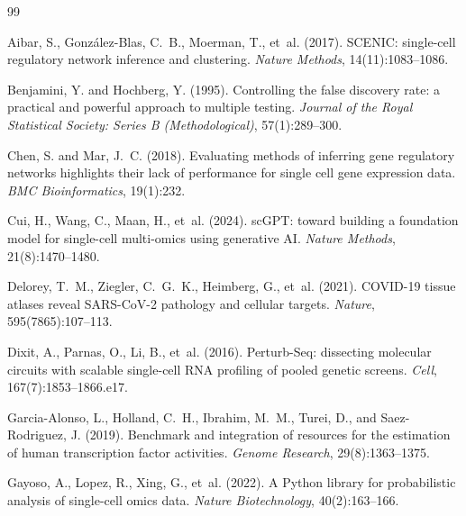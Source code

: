 \documentclass[12pt]{article}
\begin{document}
\begin{thebibliography}{99}

Aibar, S., Gonz{\'a}lez-Blas, C.~B., Moerman, T., et~al. (2017).
\newblock SCENIC: single-cell regulatory network inference and clustering.
\newblock \textit{Nature Methods}, 14(11):1083--1086.

Benjamini, Y. and Hochberg, Y. (1995).
\newblock Controlling the false discovery rate: a practical and powerful
  approach to multiple testing.
\newblock \textit{Journal of the Royal Statistical Society: Series B
  (Methodological)}, 57(1):289--300.

Chen, S. and Mar, J.~C. (2018).
\newblock Evaluating methods of inferring gene regulatory networks highlights
  their lack of performance for single cell gene expression data.
\newblock \textit{BMC Bioinformatics}, 19(1):232.

Cui, H., Wang, C., Maan, H., et~al. (2024).
\newblock scGPT: toward building a foundation model for single-cell multi-omics
  using generative AI.
\newblock \textit{Nature Methods}, 21(8):1470--1480.

Delorey, T.~M., Ziegler, C.~G.~K., Heimberg, G., et~al. (2021).
\newblock COVID-19 tissue atlases reveal SARS-CoV-2 pathology and cellular
  targets.
\newblock \textit{Nature}, 595(7865):107--113.

Dixit, A., Parnas, O., Li, B., et~al. (2016).
\newblock Perturb-Seq: dissecting molecular circuits with scalable single-cell
  RNA profiling of pooled genetic screens.
\newblock \textit{Cell}, 167(7):1853--1866.e17.

Garcia-Alonso, L., Holland, C.~H., Ibrahim, M.~M., Turei, D., and
  Saez-Rodriguez, J. (2019).
\newblock Benchmark and integration of resources for the estimation of human
  transcription factor activities.
\newblock \textit{Genome Research}, 29(8):1363--1375.

Gayoso, A., Lopez, R., Xing, G., et~al. (2022).
\newblock A Python library for probabilistic analysis of single-cell omics data.
\newblock \textit{Nature Biotechnology}, 40(2):163--166.


\end{thebibliography}
\end{document}
